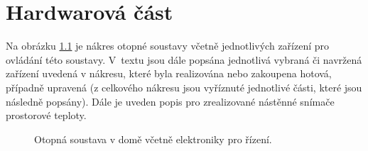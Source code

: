 \chapter{Hardwarová část}

Na obrázku \ref{fig:otopna-soustava-a-elektronika-rez-domu} je nákres otopné soustavy včetně jednotlivých zařízení pro ovládání této soustavy. V~textu jsou dále popsána jednotlivá vybraná či navržená zařízení uvedená v nákresu, které byla realizována nebo zakoupena hotová, případně upravená (z celkového nákresu jsou vyříznuté jednotlivé části, které jsou následně popsány). Dále je uveden popis pro zrealizované nástěnné snímače prostorové teploty.

\newpage

\begin{figure}[H]
    \centering
    \def\svgwidth{\columnwidth}
    
    \caption{Otopná soustava v domě včetně elektroniky pro řízení.}
    \label{fig:otopna-soustava-a-elektronika-rez-domu}
\end{figure}


























